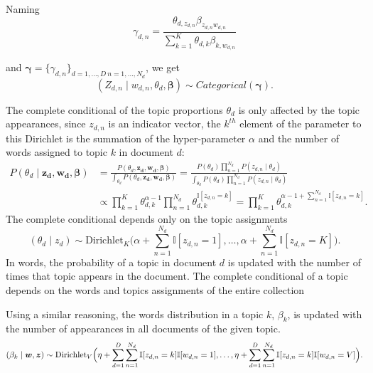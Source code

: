 Naming 
\[
  \gamma_{d,n} = \frac{\theta_{d,z_{d,n}}\beta_{z_{d,n}w_{d,n}}}{\sum_{k=1}^K \theta_{d,k}\beta_{k,w_{d,n}}}
\] 

and \(\bm{\gamma} = \{\gamma_{d,n}\}_{d=1,\dots,D \ n=1,\dots,N_{d}}\), we get
\[
  (Z_{d,n} \mid w_{d,n}, \theta_{d}, \bm{\beta}) \sim Categorical(\bm{\gamma}).
\]

The complete conditional of the topic proportions \(\theta_{d}\) is only affected by the topic appearances, since \(z_{d,n}\) is an indicator vector, the \(k^{th}\) element of the parameter to this Dirichlet is the summation of the hyper-parameter \(\alpha\) and the number of words assigned to topic \(k\) in document \(d\):
\[
  \begin{aligned}
    P(\theta_{d} \mid \bm{z_{d}},\bm{w_{d}}, \bm{\beta}) &= \frac{P(\theta_{d}, \bm{z_{d}}, \bm{w_{d}}, \bm{\beta})}{\int_{\theta_{d}} P(\theta_{d}, \bm{z_{d}}, \bm{w_{d}}, \bm{\beta})} = \frac{ P(\theta_{d})\prod_{n=1}^{N_{d}}P(z_{d,n}\mid \theta_{d}) }{ \int_{\theta_{d}}  P(\theta_{d})\prod_{n=1}^{N_{d}}P(z_{d,n}\mid \theta_{d})  }\\
    &\propto \prod_{k=1}^{K}\theta_{d,k}^{\alpha-1} \prod_{n=1}^{N_{d}}\theta_{d,k}^{\mathbb{I}[z_{d,n}=k]} = \prod_{k=1}^{K}\theta_{d,k}^{\alpha -1 + \sum_{n=1}^{N_{d}} \mathbb{I}[z_{d,n}=k] }.
  \end{aligned}
\]
The complete conditional depends only on the topic assignments
\[
  (\theta_{d} \mid z_{d}) \sim \text{Dirichlet}_{K}\Big(\alpha + \sum_{n=1}^{N_{d}} \mathbb{I}[z_{d,n}=1],\dots, \alpha + \sum_{n=1}^{N_{d}} \mathbb{I}[z_{d,n}=K]\Big).
\]
In words, the probability of a topic in document \(d\) is updated with the number of times that topic appears in the document. The complete conditional of a topic depends on the words and topics assignments of the entire collection

Using a similar reasoning, the words distribution in a topic \(k\), \(\beta_{k}\), is updated with the number of appearances in all documents of the given topic.
\[
  (\beta_{k} \mid \bm{w}, \bm{z}) \sim \text{Dirichlet}_{V}\Big(\eta + \sum_{d=1}^{D}\sum_{n=1}^{N_{d}}\mathbb{I}[z_{d,n} = k]\mathbb{I}[w_{d,n} = 1], \dots, \eta + \sum_{d=1}^{D}\sum_{n=1}^{N_{d}}\mathbb{I}[z_{d,n} = k]\mathbb{I}[w_{d,n} = V]\Big).
\]
